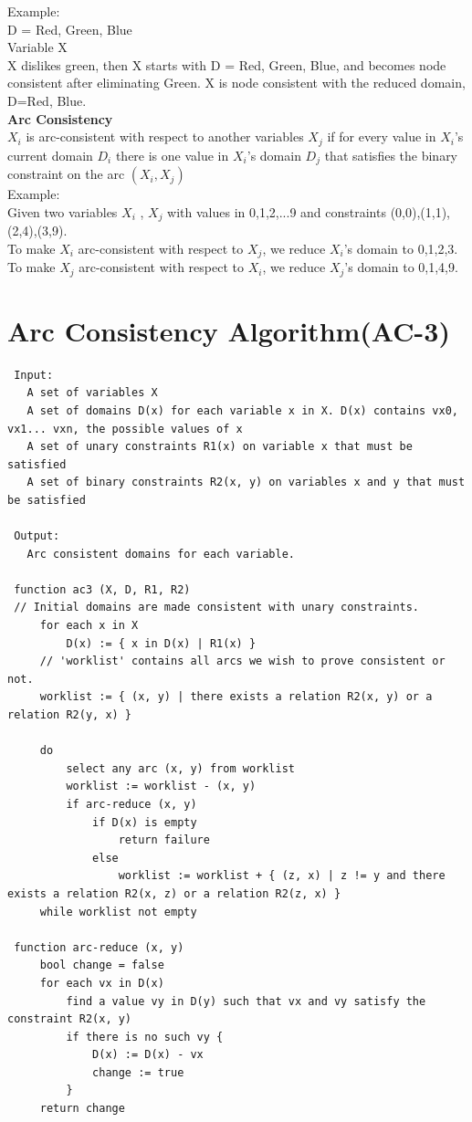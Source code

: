 Example:\\
D = {Red, Green, Blue}\\
Variable X\\
X dislikes green, then X starts with D = {Red, Green, Blue}, and becomes node consistent after eliminating {Green}.
X is node consistent with the reduced domain, D={Red, Blue}.\\

\textbf{Arc Consistency}\\
$X_i$ is arc-consistent with respect to another variables $X_j$ if for every value in $X_i$’s current domain $D_i$ there is one value in $X_i$’s domain $D_j$ that satisfies the binary constraint on the arc $(X_i , X_j)$\\[3ex]

Example:\\
Given two variables $X_i$ , $X_j$ with values in {0,1,2,...9} and constraints 
(0,0),(1,1),(2,4),(3,9).\\
To make $X_i$ arc-consistent with respect to $X_j$, we reduce $X_i$’s domain to {0,1,2,3}.\\
To make $X_j$ arc-consistent with respect to $X_i$, we reduce $X_j$’s domain to {0,1,4,9}.\\

\newpage
\section{Arc Consistency Algorithm(AC-3)}
\begin{lstlisting}
 Input:
   A set of variables X
   A set of domains D(x) for each variable x in X. D(x) contains vx0, vx1... vxn, the possible values of x
   A set of unary constraints R1(x) on variable x that must be satisfied
   A set of binary constraints R2(x, y) on variables x and y that must be satisfied
   
 Output:
   Arc consistent domains for each variable.
 
 function ac3 (X, D, R1, R2)
 // Initial domains are made consistent with unary constraints.
     for each x in X
         D(x) := { x in D(x) | R1(x) }   
     // 'worklist' contains all arcs we wish to prove consistent or not.
     worklist := { (x, y) | there exists a relation R2(x, y) or a relation R2(y, x) }
 
     do
         select any arc (x, y) from worklist
         worklist := worklist - (x, y)
         if arc-reduce (x, y) 
             if D(x) is empty
                 return failure
             else
                 worklist := worklist + { (z, x) | z != y and there exists a relation R2(x, z) or a relation R2(z, x) }
     while worklist not empty
 
 function arc-reduce (x, y)
     bool change = false
     for each vx in D(x)
         find a value vy in D(y) such that vx and vy satisfy the constraint R2(x, y)
         if there is no such vy {
             D(x) := D(x) - vx
             change := true
         }
     return change
\end{lstlisting}

